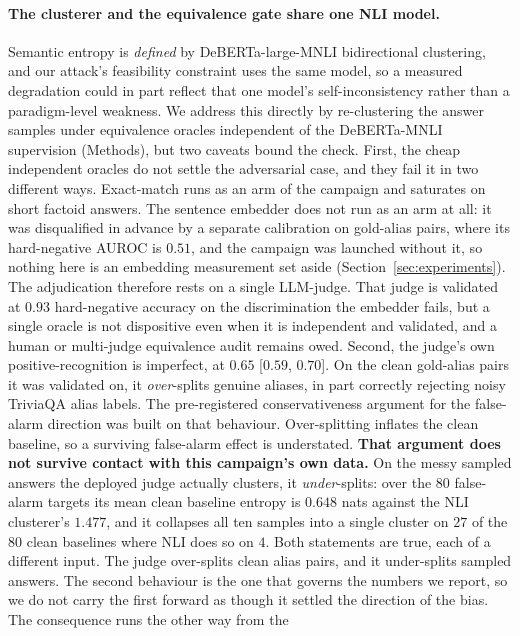 \paragraph{The clusterer and the equivalence gate share one NLI model.}
Semantic entropy is \emph{defined} by DeBERTa-large-MNLI bidirectional clustering, and our
attack's feasibility constraint uses the same model, so a measured degradation could in part
reflect that one model's self-inconsistency rather than a paradigm-level weakness. We address
this directly by re-clustering the answer samples under equivalence oracles independent of the
DeBERTa-MNLI supervision (Methods), but two caveats bound the check. First, the cheap
independent oracles do not settle the adversarial case, and they fail it in two different
ways. Exact-match runs as an arm of the campaign and saturates on short factoid answers.
The sentence embedder does not run as an arm at all: it was disqualified in advance by a
separate calibration on gold-alias pairs, where its hard-negative AUROC is $0.51$, and the
campaign was launched without it, so nothing here is an embedding measurement set aside
(Section~\ref{sec:experiments}). The adjudication therefore rests on a single LLM-judge.
That judge is
validated at $0.93$ hard-negative accuracy on the discrimination the embedder fails, but a
single oracle is not
dispositive even when it is independent and validated, and a human or multi-judge equivalence
audit remains owed. Second, the judge's own positive-recognition is imperfect, at $0.65$
[$0.59$, $0.70$]. On the clean gold-alias pairs it was validated on, it \emph{over}-splits
genuine aliases, in part correctly rejecting noisy TriviaQA alias labels. The pre-registered
conservativeness argument for the false-alarm direction was built on that behaviour.
Over-splitting inflates the clean baseline, so a surviving false-alarm effect is understated.
\textbf{That argument does not survive contact with this campaign's own data.} On the messy
sampled answers the deployed judge actually clusters, it \emph{under}-splits: over the $80$
false-alarm targets its mean clean baseline entropy is $0.648$ nats against the NLI clusterer's
$1.477$, and it collapses all ten samples into a single cluster on $27$ of the $80$ clean
baselines where NLI does so on $4$. Both statements are true, each of a different input. The
judge over-splits clean alias pairs, and it under-splits sampled answers. The second behaviour
is the one that governs the numbers we report, so we do not carry the first forward as though
it settled the direction of the bias. The consequence runs the other way from the
